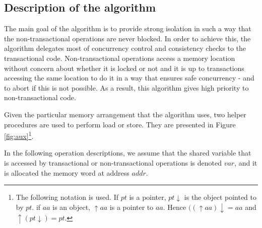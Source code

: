 \documentclass[11pt,letterpaper]{article}
\begin{document}

\subsection{Description of the algorithm}

The main goal of the algorithm is to provide strong isolation 
in such a way that  the non-transactional  operations are never blocked. 
In order  to achieve this,  the algorithm delegates most of  
concurrency   control   and  consistency   checks   to  the   transactional
code. Non-transactional  
operations access  a memory  location without concern  about whether  it is
locked or not  and it is  up to transactions accessing the same location to
do it in a way that ensures safe  
concurrency - and to abort if this  is not possible.  As a
result, this algorithm gives high  priority   to non-transactional code. 

Given the particular memory arrangement  that the algorithm uses, two helper
procedures are used  to perform load  or store. They are
presented  in  Figure  \ref{fig:aux}\footnote{The following  notation  is
used. If $pt$ is a pointer, $pt\downarrow$ is the object pointed to by $pt$. 
if $aa$ is an object, $\uparrow aa$ is a pointer to $aa$. Hence 
$((\uparrow aa)\downarrow =aa$ and $ \uparrow(pt \downarrow)=pt$.}.


\begin{figure}[htb]
\end{figure}


In the following operation descriptions, we assume that the shared variable
that  is   accessed  by  transactional or  non-transactional operations  is
denoted $\mathit{var}$, and   
it is allocated the memory word at address $\mathit{addr}$.
\end{document}
